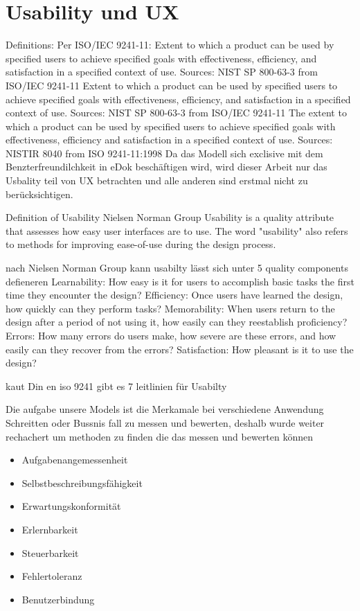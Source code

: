 \documentclass[12pt,oneside]{article}
\begin{document}
\section{Usability und UX}
Definitions:
Per ISO/IEC 9241-11: Extent to which a product can be used by specified users to achieve specified goals with effectiveness, efficiency, and satisfaction in a specified context of use.
Sources:
NIST SP 800-63-3 from ISO/IEC 9241-11
Extent to which a product can be used by specified users to achieve specified goals with effectiveness, efficiency, and satisfaction in a specified context of use.
Sources:
NIST SP 800-63-3 from ISO/IEC 9241-11
The extent to which a product can be used by specified users to achieve specified goals with effectiveness, efficiency and satisfaction in a specified context of use.
Sources:
NISTIR 8040 from ISO 9241-11:1998
Da das Modell sich exclisive mit dem Benzterfreundilchkeit in eDok beschäftigen wird, wird dieser Arbeit nur das Usbality teil von UX betrachten und alle anderen sind erstmal nicht zu berücksichtigen.

Definition of Usability  Nielsen Norman Group
Usability is a quality attribute that assesses how easy user interfaces are to use. The word "usability" also refers to methods for improving ease-of-use during the design process.

nach Nielsen Norman Group kann usabilty lässt sich unter 5 quality components defieneren 
Learnability: How easy is it for users to accomplish basic tasks the first time they encounter the design?
Efficiency: Once users have learned the design, how quickly can they perform tasks?
Memorability: When users return to the design after a period of not using it, how easily can they reestablish proficiency?
Errors: How many errors do users make, how severe are these errors, and how easily can they recover from the errors?
Satisfaction: How pleasant is it to use the design?

kaut Din en iso 9241 gibt es 7 leitlinien für Usabilty 


Die aufgabe unsere Models ist die Merkamale bei verschiedene Anwendung Schreitten oder Bussnis fall zu messen und bewerten, deshalb wurde weiter rechachert um methoden zu finden die das messen und bewerten können

\begin{itemize}
\item Aufgabenangemessenheit
\item Selbstbeschreibungsfähigkeit
\item Erwartungskonformität
\item Erlernbarkeit
\item Steuerbarkeit
\item Fehlertoleranz
\item Benutzerbindung
\end{itemize}
\end{document}
